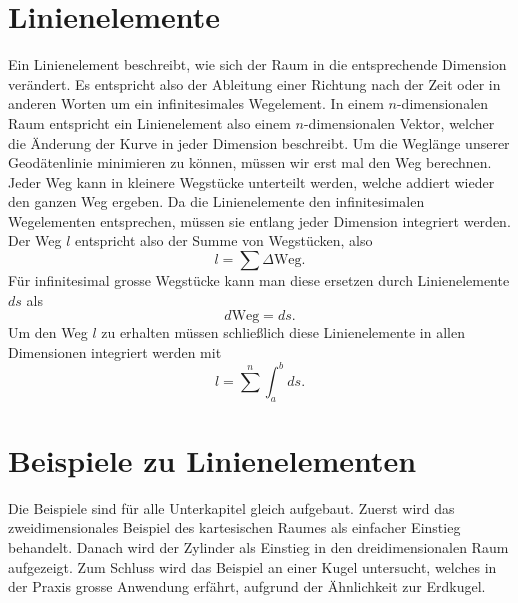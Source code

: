 %
%
%
%
\section{Linienelemente\label{geodaeten:section:Linienelemente}}

Ein Linienelement beschreibt, wie sich der Raum in die entsprechende Dimension verändert.
Es entspricht also der Ableitung einer Richtung nach der Zeit oder in anderen Worten um ein infinitesimales Wegelement.
In einem $n$-dimensionalen Raum entspricht ein Linienelement also einem $n$-dimensionalen Vektor, welcher die Änderung der Kurve in jeder Dimension beschreibt.
Um die Weglänge unserer Geodätenlinie minimieren zu können, müssen wir erst mal den Weg berechnen.
Jeder Weg kann in kleinere Wegstücke unterteilt werden, welche addiert wieder den ganzen Weg ergeben.
Da die Linienelemente den infinitesimalen Wegelementen entsprechen, müssen sie entlang jeder Dimension integriert werden.
Der Weg $l$ entspricht also der Summe von Wegstücken, also
\begin{equation}
	l = \sum \Delta \text{Weg} .
\end{equation}
Für infinitesimal grosse Wegstücke kann man diese ersetzen durch Linienelemente $ds$  als
\begin{equation}	
	d\text{Weg} = ds .
	\label{geodaeten:equation:Linienelemente:equation1}
\end{equation}
Um den Weg $l$ zu erhalten müssen schließlich diese Linienelemente in allen Dimensionen integriert werden mit
\begin{equation}
	l = 
	\sum^{n} \int_a^b ds .
	\label{geodaeten:equation:Linienelemente:equation2}
\end{equation}

\section{Beispiele zu Linienelementen\label{geodaeten:section:Linienelemente:Beispiele}}
Die Beispiele sind für alle Unterkapitel gleich aufgebaut.
Zuerst wird das zweidimensionales Beispiel des kartesischen Raumes als einfacher Einstieg behandelt.
Danach wird der Zylinder als Einstieg in den dreidimensionalen Raum aufgezeigt.
Zum Schluss wird das Beispiel an einer Kugel untersucht, welches in der Praxis grosse Anwendung erfährt, aufgrund der Ähnlichkeit zur Erdkugel.

	
	
	

